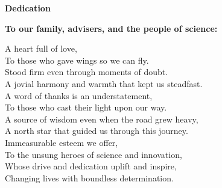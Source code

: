 \begin{center}
	\textbf{Dedication}
	
	\vspace{0.75cm}
	\textbf{To our family, advisers, and the people of science:}
	
	\vspace{0.85cm}
	A heart full of love, \\
	To those who gave wings so we can fly. \\
	Stood firm even through moments of doubt. \\
	A jovial harmony and warmth that kept us steadfast. \\
	
	\vspace{0.75cm}
	A word of thanks is an understatement, \\
	To those who cast their light upon our way. \\
	A source of wisdom even when the road grew heavy, \\
	A north star that guided us through this journey. \\
	
	\vspace{0.75cm}
	Immeasurable esteem we offer, \\
	To the unsung heroes of science and innovation, \\
	Whose drive and dedication uplift and inspire, \\
	Changing lives with boundless determination. \\
	
\end{center}


